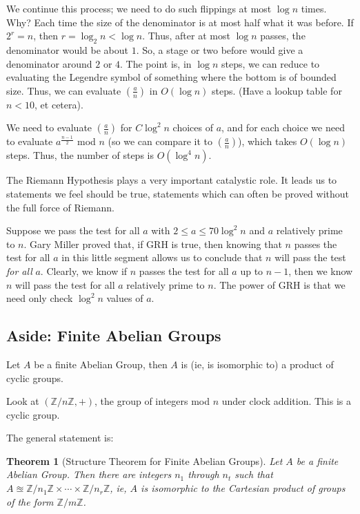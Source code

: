 \documentclass[12pt,letterpaper]{report}
\newcommand{\Z}{\ensuremath{\mathbb{Z}}}
\newcommand\lag[2]{\ensuremath{\left(\frac{#1}{#2}\right)}}
\newtheorem{thm}{Theorem}[section]
\begin{document}
We continue this process; we need to do such flippings at most
$\log n$ times. Why? Each time the size of the denominator is at
most half what it was before. If $2^r = n$, then $r = \log_2 n <
\log n$. Thus, after at most $\log n$ passes, the denominator
would be about $1$. So, a stage or two before would give a
denominator around $2$ or $4$. The point is, in $\log n$ steps, we
can reduce to evaluating the Legendre symbol of something where
the bottom is of bounded size. Thus, we can evaluate $\lag{a}{n}$
in $O(\log n)$ steps. (Have a lookup table for $n < 10$, et
cetera).

We need to evaluate $\lag{a}{n}$ for $C \log^2 n$ choices of $a$,
and for each choice we need to evaluate $a^{\frac{n-1}{2}}$ mod
$n$ (so we can compare it to $\lag{a}{n}$), which takes $O(\log
n)$ steps. Thus, the number of steps is $O(\log^4 n)$.

The Riemann Hypothesis plays a very important catalystic role. It
leads us to statements we feel should be true, statements which
can often be proved without the full force of Riemann.

Suppose we pass the test for all $a$ with $2 \le a \le 70 \log^2
n$ and $a$ relatively prime to $n$. Gary Miller proved that, if
GRH is true, then knowing that $n$ passes the test for all $a$ in
this little segment allows us to conclude that $n$ will pass the
test \emph{for all} $a$. Clearly, we know if $n$ passes the test
for all $a$ up to $n-1$, then we know $n$ will pass the test for
all $a$ relatively prime to $n$. The power of GRH is that we need
only check $\log^2 n$ values of $a$.

\subsection{Aside: Finite Abelian Groups}

Let $A$ be a finite Abelian Group, then $A$ is  (ie, is isomorphic
to) a product of cyclic groups.

Look at $(\Z / n\Z, +)$, the group of integers mod $n$ under clock
addition. This is a cyclic group.

The general statement is:

\begin{thm}[Structure Theorem for Finite Abelian Groups] Let $A$
be a finite Abelian Group. Then there are integers $n_1$ through
$n_t$ such that $A \approxeq \Z / n_1\Z \times \cdots \times \Z/
n_r \Z$, ie, $A$ is isomorphic to the Cartesian product of groups
of the form $\Z/m\Z$.
\end{thm}
\end{document}
